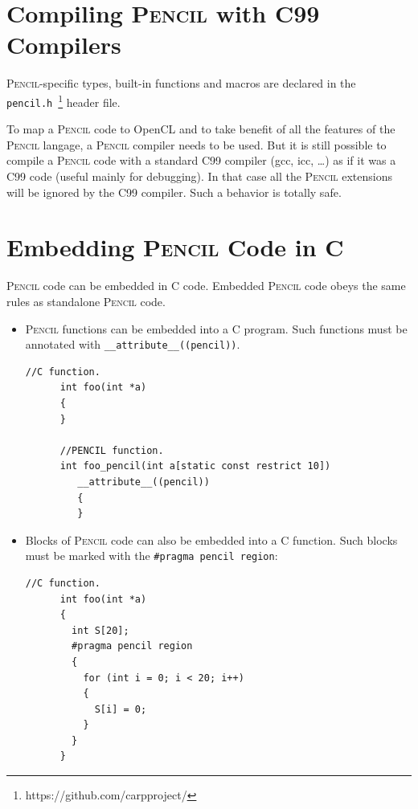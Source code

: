 \documentclass{carp}
\newcommand\pencil{\textsc{Pencil}\xspace}
\begin{document}
\section{Compiling \pencil with C99 Compilers}

\pencil-specific types, built-in functions and macros are declared in
the \texttt{pencil.h}~\footnote{https://github.com/carpproject/}
header file.

To map a \pencil code to OpenCL and to take benefit of all the features
of the \pencil langage, a \pencil compiler needs to be used.
But it is still possible to compile a \pencil code with a standard C99
compiler (gcc, icc, \dots) as if it was a C99 code (useful mainly for
debugging).
In that case all the \pencil extensions will be ignored by the C99
compiler.  Such a behavior is totally safe.


\section{Embedding \pencil Code in C}
\label{sec:pencil-as-c-ext}

\pencil code can be embedded in C code.
Embedded \pencil code obeys the same rules as standalone \pencil code.

\begin{itemize}
  \item \pencil functions can be embedded into a C program.
    Such functions must be annotated with \lstinline!__attribute__((pencil))!.
    \begin{lstlisting}[language=pencil]
      //C function.
      int foo(int *a)
      {
      }

      //PENCIL function.
      int foo_pencil(int a[static const restrict 10])
         __attribute__((pencil))
         {
         }
       \end{lstlisting}

  \item Blocks of \pencil code can also be embedded into a C function.
    Such blocks must be marked with the \lstinline!#pragma pencil region!:
    \begin{lstlisting}[language=pencil]
      //C function.
      int foo(int *a)
      {
        int S[20];
        #pragma pencil region
        {
          for (int i = 0; i < 20; i++)
          {
            S[i] = 0;
          }
        }
      }
    \end{lstlisting}
\end{itemize}
\end{document}
